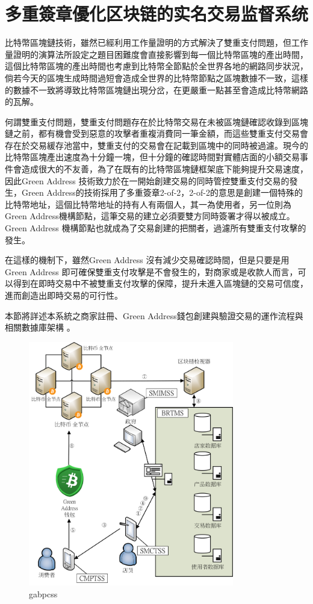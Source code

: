 
\chapter{多重簽章優化区块链的实名交易监督系统}

比特幣區塊鏈技術，雖然已經利用工作量證明的方式解決了雙重支付問題，但工作量證明的演算法所設定之題目困難度會直接影響到每一個比特幣區塊的產出時間，這個比特幣區塊的產出時間也考慮到比特幣全節點於全世界各地的網路同步狀況，倘若今天的區塊生成時間過短會造成全世界的比特幣節點之區塊數據不一致，這樣的數據不一致將導致比特幣區塊鏈出現分岔，在更嚴重一點甚至會造成比特幣網路的瓦解。 

何謂雙重支付問題，雙重支付問題存在於比特幣交易在未被區塊鏈確認收錄到區塊鏈之前，都有機會受到惡意的攻擊者重複消費同一筆金額，而這些雙重支付交易會存在於交易緩存池當中，雙重支付的交易會在記載到區塊中的同時被過濾。現今的比特幣區塊產出速度為十分鐘一塊，但十分鐘的確認時間對實體店面的小額交易事件會造成很大的不友善，為了在既有的比特幣區塊鏈框架底下能夠提升交易速度，因此Green Address 技術致力於在一開始創建交易的同時管控雙重支付交易的發生，Green Address的技術採用了多重簽章2-of-2，2-of-2的意思是創建一個特殊的比特幣地址，這個比特幣地址的持有人有兩個人，其一為使用者，另一位則為Green Address機構節點，這筆交易的建立必須要雙方同時簽署才得以被成立。Green Address 機構節點也就成為了交易創建的把關者，過濾所有雙重支付攻擊的發生。 

在這樣的機制下，雖然Green Address 沒有減少交易確認時間，但是只要是用Green Address 即可確保雙重支付攻擊是不會發生的，對商家或是收款人而言，可以得到在即時交易中不被雙重支付攻擊的保障，提升未進入區塊鏈的交易可信度，進而創造出即時交易的可行性。 

本節將詳述本系統之商家註冊、Green Address錢包創建與驗證交易的運作流程與相關數據庫架構 。

	\begin{figure}[h]
		\centering
		\includegraphics[width = 0.8\textwidth]{gabpcss.png}
		\caption{gabpcss}\label{gabpcss}
	\end{figure}

